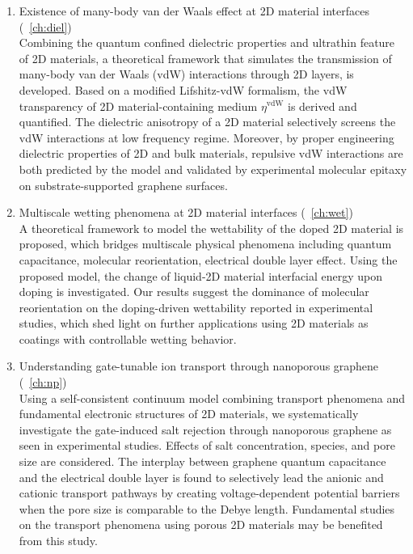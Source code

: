 \begin{enumerate}
  
\item Existence of many-body van der Waals effect at 2D material
  interfaces (~\autoref{ch:diel})\\
  Combining the quantum confined dielectric properties and ultra\-thin
  feature of 2D materials, a theoretical framework that simulates the
  transmission of many-body van der Waals (vdW) interactions through
  2D layers, is developed. Based on a modified Lifshitz-vdW formalism,
  the vdW transparency of 2D material-containing medium
  $\eta^{\mathrm{vdW}}$ is derived and quantified.  The
  dielectric anisotropy of a 2D material selectively screens the vdW
  interactions at low frequency regime. Moreover, by proper
  engineering dielectric properties of 2D and bulk materials,
  repulsive vdW interactions are both predicted by the model and validated
  by  experimental molecular epitaxy on substrate-supported graphene surfaces.

  
\item Multiscale wetting phenomena at 2D material interfaces (~\autoref{ch:wet})\\
  A theoretical framework to model the wettability of the doped 2D
  material is proposed, which bridges multiscale physical phenomena
  including quantum capacitance, molecular reorientation, electrical
  double layer effect. Using the proposed model, the change of
  liquid-2D material interfacial energy upon doping is
  investigated. Our results suggest the dominance of molecular
  reorientation on the doping-driven wettability reported in
  experimental studies, which shed light on further applications using
  2D materials as coatings with controllable wetting behavior.

  
\item Understanding gate-tunable ion transport through nanoporous graphene (~\autoref{ch:np})\\
  Using a self-consistent continuum model combining transport
  phenomena and fundamental electronic structures of 2D materials, we
  systematically investigate the gate-induced salt rejection through
  nanoporous graphene as seen in experimental studies.  Effects of
  salt concentration, species, and pore size are considered. The
  interplay between graphene quantum capacitance and the electrical
  double layer is found to selectively lead the anionic and cationic
  transport pathways by creating voltage-dependent potential barriers
  when the pore size is comparable to the Debye length. Fundamental
  studies on the transport phenomena using porous 2D materials may be
  benefited from this study.


\end{enumerate}
